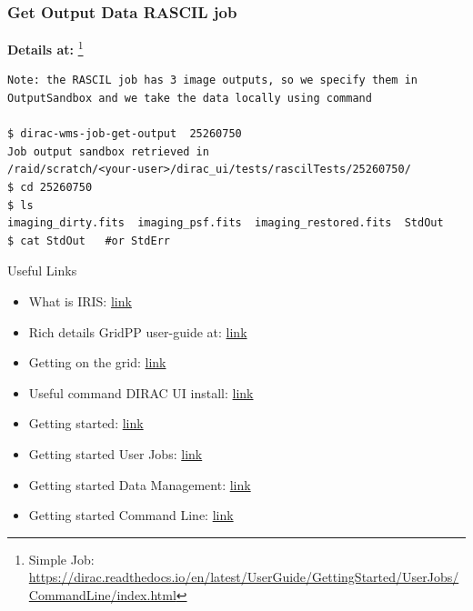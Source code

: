 \documentclass{beamer}
\begin{document}
\begin{frame}[fragile]
\frametitle{Get Output Data RASCIL job}
\textbf{Details at:} \footnote {Simple Job: \url{https://dirac.readthedocs.io/en/latest/UserGuide/GettingStarted/UserJobs/CommandLine/index.html}}
\begin{verbatim}
Note: the RASCIL job has 3 image outputs, so we specify them in 
OutputSandbox and we take the data locally using command

$ dirac-wms-job-get-output  25260750
Job output sandbox retrieved in 
/raid/scratch/<your-user>/dirac_ui/tests/rascilTests/25260750/
$ cd 25260750
$ ls
imaging_dirty.fits  imaging_psf.fits  imaging_restored.fits  StdOut
$ cat StdOut   #or StdErr
\end{verbatim}
\end{frame}

\begin{frame}{Useful Links}
\begin{center}
    \begin{itemize}
 \item What is IRIS: \href{https://www.iris.ac.uk/about-iris/}{ link} 

\item Rich details GridPP user-guide at:    \href{https://github.com/GridPP/user-guides}{link}

\item Getting on the grid: \href{https://github.com/gridpp/user-guides/tree/master/getting-on-the-grid}{link}

\item Useful command DIRAC UI install: \href{https://github.com/as595/SKA-IRIS/tree/master/DIRACUI}{link}

\item Getting started: \href{https://dirac.readthedocs.io/en/latest/UserGuide/GettingStarted/index.html}{link}

\item Getting started User Jobs:
\href{https://dirac.readthedocs.io/en/latest/UserGuide/GettingStarted/UserJobs/index.html}{link}

\item Getting started Data Management:
\href{https://dirac.readthedocs.io/en/latest/UserGuide/CommandReference/DataManagement/index.html}{link}

\item Getting started Command Line:
\href{https://dirac.readthedocs.io/en/latest/UserGuide/GettingStarted/UserJobs/CommandLine/index.html}{link}

\end{itemize}
\end{center}
\end{frame}
\end{document}

